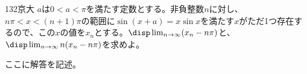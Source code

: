 \begin{prob}{132}{}{京大}
 $a$は$0<a<\pi$を満たす定数とする。非負整数$n$に対し、$n\pi<x<(n+1)\pi$の範囲に$\sin(x+a)=x\sin x$を満たす$x$がただ1つ存在するので、この$x$の値を$x_n$とする。$\disp \lim_{n\to\infty} (x_n-n\pi)$と、$\disp \lim_{n\to\infty} n(x_n-n\pi)$を求めよ。
\end{prob}

ここに解答を記述。